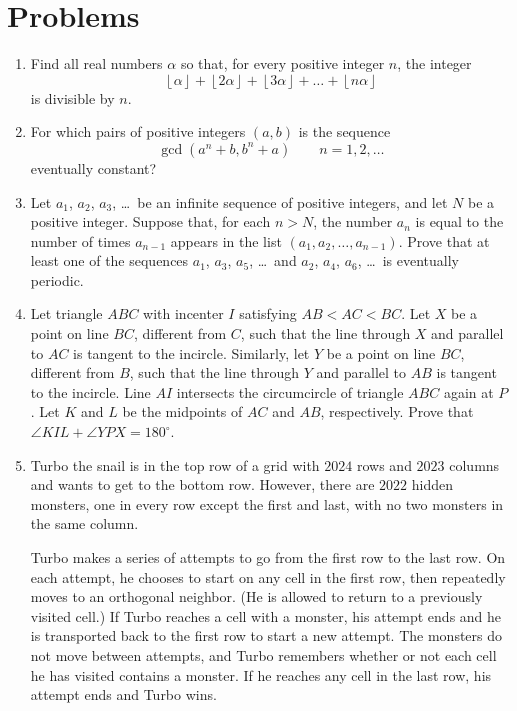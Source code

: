 \documentclass[11pt]{scrartcl}
\begin{document}
\section{Problems}
\begin{enumerate}[\bfseries 1.]
\item %
Find all real numbers $\alpha$ so that, for every positive integer $n$, the integer
\[ \left\lfloor \alpha \right\rfloor + \left\lfloor 2 \alpha \right\rfloor
  + \left\lfloor 3 \alpha \right\rfloor + \dots + \left\lfloor n \alpha \right\rfloor \]
is divisible by $n$.

\item %
For which pairs of positive integers $(a,b)$ is the sequence
\[ \gcd(a^n+b, b^n+a) \qquad n = 1, 2, \dotsc \]
eventually constant?

\item %
Let $a_1$, $a_2$, $a_3$, \dots\ be an infinite sequence of positive integers,
and let $N$ be a positive integer.
Suppose that, for each $n > N$,
the number $a_n$ is equal to the number of times $a_{n-1}$ appears
in the list $(a_1, a_2, \dots, a_{n-1})$.
Prove that at least one of the sequences $a_1$, $a_3$, $a_5$, \dots\
and $a_2$, $a_4$, $a_6$, \dots\ is eventually periodic.

\item %
Let triangle $ABC$ with incenter $I$ satisfying $AB < AC < BC$.
Let $X$ be a point on line $BC$, different from $C$,
such that the line through $X$ and parallel to $AC$ is tangent to the incircle.
Similarly, let $Y$ be a point on line $BC$, different from $B$,
such that the line through $Y$ and parallel to $AB$ is tangent to the incircle.
Line $AI$ intersects the circumcircle of triangle $ABC$ again at $P$.
Let $K$ and $L$ be the midpoints of $AC$ and $AB$, respectively.
Prove that $\angle KIL + \angle YPX = 180^{\circ}$.

\item %
Turbo the snail is in the top row of a grid with $2024$ rows and $2023$ columns
and wants to get to the bottom row.
However, there are $2022$ hidden monsters, one in every row except the first and last,
with no two monsters in the same column.

Turbo makes a series of attempts to go from the first row to the last row.
On each attempt, he chooses to start on any cell in the first row,
then repeatedly moves to an orthogonal neighbor.
(He is allowed to return to a previously visited cell.)
If Turbo reaches a cell with a monster,
his attempt ends and he is transported back to the first row to start a new attempt.
The monsters do not move between attempts, and Turbo remembers whether or not each cell
he has visited contains a monster.
If he reaches any cell in the last row, his attempt ends and Turbo wins.


\end{enumerate}
\end{document}
